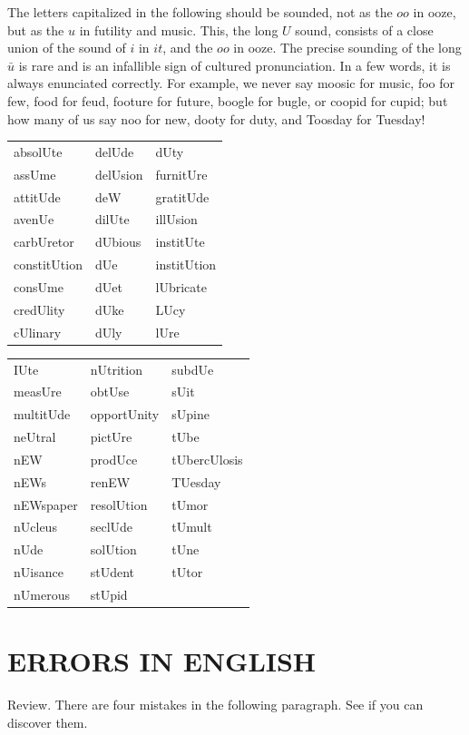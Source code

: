 \documentclass[10pt]{article}
\begin{document}
The letters capitalized in the following should be sounded, not as the $o o$ in ooze, but as the $u$ in futility and music. This, the long $U$ sound, consists of a close union of the sound of $i$ in $i t$, and the $o o$ in ooze. The precise sounding of the long $\bar{u}$ is rare and is an infallible sign of cultured pronunciation. In a few words, it is always enunciated correctly. For example, we never say moosic for music, foo for few, food for feud, footure for future, boogle for bugle, or coopid for cupid; but how many of us say noo for new, dooty for duty, and Toosday for Tuesday!

\begin{center}
\begin{tabular}{lll}
absolUte & delUde & dUty \\
assUme & delUsion & furnitUre \\
attitUde & deW & gratitUde \\
avenUe & dilUte & illUsion \\
carbUretor & dUbious & institUte \\
constitUtion & dUe & institUtion \\
consUme & dUet & lUbricate \\
credUlity & dUke & LUcy \\
cUlinary & dUly & lUre \\
\end{tabular}
\end{center}

\begin{center}
\begin{tabular}{lll}
IUte & nUtrition & subdUe \\
measUre & obtUse & sUit \\
multitUde & opportUnity & sUpine \\
neUtral & pictUre & tUbe \\
nEW & prodUce & tUbercUlosis \\
nEWs & renEW & TUesday \\
nEWspaper & resolUtion & tUmor \\
nUcleus & seclUde & tUmult \\
nUde & solUtion & tUne \\
nUisance & stUdent & tUtor \\
nUmerous & stUpid &  \\
\end{tabular}
\end{center}

\section*{ERRORS IN ENGLISH}
Review. There are four mistakes in the following paragraph. See if you can discover them.
\end{document}
